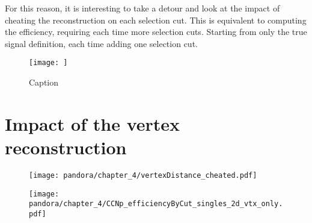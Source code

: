 For this reason, it is interesting to take a detour and look at the impact of cheating the reconstruction on each selection cut. This is equivalent to computing the efficiency, requiring each time more selection cuts. Starting from only the true signal definition, each time adding one selection cut. 

\begin{figure}
    \centering
    \texttt{[image: ]}
    \caption{Caption}
    \label{fig:enter-label}
\end{figure}



\section{Impact of the vertex reconstruction}


\cite{Triozzi:2025_impactNueReconstruction, Sotgia:2025_cheatingPandoraStatus}

\begin{figure}
    \centering
    \texttt{[image: pandora/chapter\_4/vertexDistance\_cheated.pdf]}
    \caption{}
    \label{fig:enter-label}
\end{figure}


\begin{figure}
    \centering
    \texttt{[image: pandora/chapter\_4/CCNp\_efficiencyByCut\_singles\_2d\_vtx\_only.pdf]}
    \caption{}
    \label{fig:enter-label}
\end{figure}